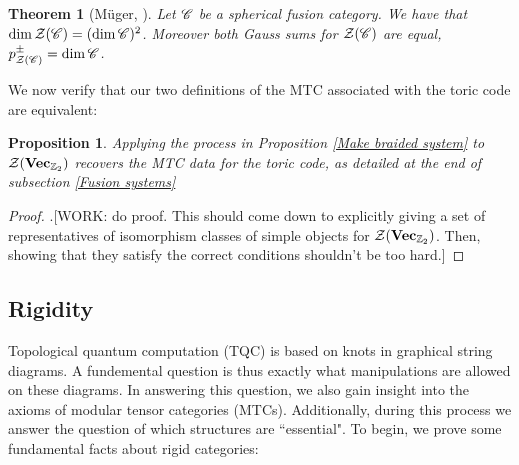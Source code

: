 \documentclass{article}
\newtheorem{theorem}{Theorem}[section]
\newtheorem{proposition}{Proposition}[section]
\theoremstyle{definition}
\numberwithin{figure}{section}
\begin{document}
\begin{theorem}[Müger, \cite{muger2003subfactors}] Let $\mathscr{C}$ be a spherical fusion category. We have that $\dim \mathcal{Z}(\mathscr{C}) = (\dim \mathscr{C})^2$. Moreover both Gauss sums for $\mathcal{Z}(\mathscr{C})$ are equal, $p_{\mathcal{Z}(\mathscr{C})}^{\pm}=\dim \mathscr{C}$.
\end{theorem}

We now verify that our two definitions of the MTC associated with the toric code are equivalent:

\begin{proposition} Applying the process in Proposition \ref{Make braided system} to $\mathcal{Z}(\bold{Vec}_{\mathbb{Z}_2})$ recovers the MTC data for the toric code, as detailed at the end of subsection \ref{Fusion systems}
\end{proposition}
\begin{proof} .[WORK: do proof. This should come down to explicitly giving a set of representatives of isomorphism classes of simple objects for $\mathcal{Z}(\bold{Vec}_{\mathbb{Z}_2})$. Then, showing that they satisfy the correct conditions shouldn't be too hard.]
\end{proof}

\subsection{Rigidity}
\label{Rigidity}

Topological quantum computation (TQC) is based on knots in graphical string diagrams. A fundemental question is thus exactly what manipulations are allowed on these diagrams. In answering this question, we also gain insight into the axioms of modular tensor categories (MTCs). Additionally, during this process we answer the question of which structures are ``essential". To begin, we prove some fundamental facts about rigid categories:
\end{document}
